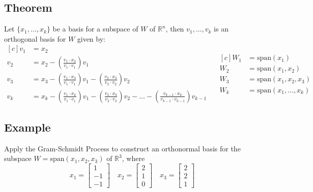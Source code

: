 \subsection*{Theorem}
Let $\{x_1,\dots,x_k\}$ be a basis for a subspace of $W$ of $\mathbb{R}^n$, then
${v_1,\dots, v_k}$ is an orthogonal basis for $W$ given by:
\begin{equation*}
    \begin{aligned}[c]
        v_1 & =x_2                                                                                                                                                                             \\
        v_2 & =x_2-\left(\frac{v_1\cdot x_2}{v_1\cdot v_1}\right)v_1                                                                                                                           \\
        v_3 & =x_3-\left(\frac{v_1\cdot x_3}{v_1\cdot v_1}\right)v_1-\left(\frac{v_2\cdot x_3}{v_2\cdot v_2}\right)v_2                                                                         \\
        v_k & =x_k-\left(\frac{v_1\cdot x_k}{v_1\cdot v_1}\right)v_1-\left(\frac{v_2\cdot x_k}{v_2\cdot v_2}\right)v_2-\dots-\left(\frac{v_{k-1}\cdot x_k}{v_{k-1}\cdot v_{k-1}}\right)v_{k-1}
    \end{aligned}
    \quad
    \begin{aligned}[c]
        W_1 & =\text{span}(x_1)           \\
        W_2 & =\text{span}(x_1,x_2)       \\
        W_3 & =\text{span}(x_1,x_2,x_3)   \\
        W_k & =\text{span}(x_1,\dots,x_k)
    \end{aligned}
\end{equation*}

\subsection*{Example}
Apply the Gram-Schmidt Process to construct an orthonormal basis for the subspace
$W = \text{span}(x_1, x_2, x_3)$ of $\mathbb{R}^3$, where
\[
    x_1=\begin{bmatrix}
        1 \\-1\\-1
    \end{bmatrix}\quad x_2=\begin{bmatrix}
        2 \\1\\0
    \end{bmatrix}\quad x_3=\begin{bmatrix}
        2 \\2\\1
    \end{bmatrix}
\]

